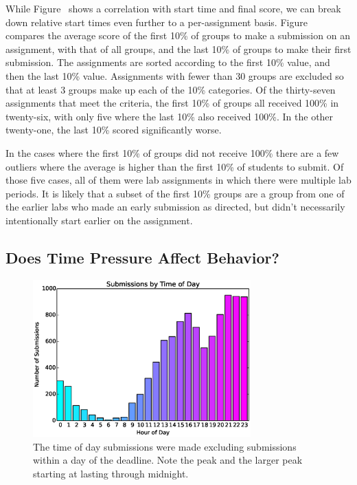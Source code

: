 While Figure~ shows a correlation with start
time and final score, we can break down relative start times even further to a
per-assignment basis. Figure~ compares the average
score of the first 10\% of groups to make a submission on an assignment, with
that of all groups, and the last 10\% of groups to make their first
submission. The assignments are sorted according to the first 10\% value, and
then the last 10\% value. Assignments with fewer than 30 groups are excluded so
that at least 3 groups make up each of the 10\% categories. Of the thirty-seven
assignments that meet the criteria, the first 10\% of groups all received 100\%
in twenty-six, with only five where the last 10\% also received 100\%. In the
other twenty-one, the last 10\% scored significantly worse.

In the cases where the first 10\% of groups did not receive 100\% there are a
few outliers where the average is higher than the first 10\% of students to
submit. Of those five cases, all of them were lab assignments in which there
were multiple lab periods. It is likely that a subset of the first 10\% groups
are a group from one of the earlier labs who made an early submission as
directed, but didn't necessarily intentionally start earlier on the assignment.

\subsection{Does Time Pressure Affect Behavior?}

\begin{figure}[!t]
\centering \includegraphics[width=3.3in]{graphs/Submissions_by_Time_of_Day.eps}
\caption{The time of day submissions were made excluding submissions within a
  day of the deadline. Note the  peak and the larger peak starting at
   lasting through midnight.}
\end{figure}

